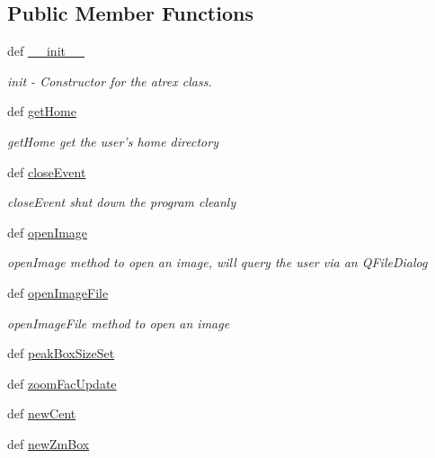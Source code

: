 \subsection*{Public Member Functions}
\begin{DoxyCompactItemize}
\item 
def \hyperlink{class_atrex_1_1_atrex_a3c7c6f6088f83b942d6773648e1e6347}{\-\_\-\-\_\-init\-\_\-\-\_\-}
\begin{DoxyCompactList}\small\item\em init -\/ Constructor for the atrex class. \end{DoxyCompactList}\item 
def \hyperlink{class_atrex_1_1_atrex_a6877cdfc8717ffc47d5e25a7fa1385f3}{get\-Home}
\begin{DoxyCompactList}\small\item\em get\-Home get the user's home directory \end{DoxyCompactList}\item 
def \hyperlink{class_atrex_1_1_atrex_a500ea9d7087f2aaf505f87998d1cf526}{close\-Event}
\begin{DoxyCompactList}\small\item\em close\-Event shut down the program cleanly \end{DoxyCompactList}\item 
def \hyperlink{class_atrex_1_1_atrex_aab80061d4d2127e82b592cbf5baef054}{open\-Image}
\begin{DoxyCompactList}\small\item\em open\-Image method to open an image, will query the user via an Q\-File\-Dialog \end{DoxyCompactList}\item 
def \hyperlink{class_atrex_1_1_atrex_a25ef435a888471b35045f63fad55b176}{open\-Image\-File}
\begin{DoxyCompactList}\small\item\em open\-Image\-File method to open an image \end{DoxyCompactList}\item 
def \hyperlink{class_atrex_1_1_atrex_ab96f78f24269b2608673faa9cec31ad8}{peak\-Box\-Size\-Set}
\item 
def \hyperlink{class_atrex_1_1_atrex_a02d26a480697d4631d2d8d2c76567a5b}{zoom\-Fac\-Update}
\item 
def \hyperlink{class_atrex_1_1_atrex_ab94534c12f07a7fcce69bbfc8a175692}{new\-Cent}
\item 
def \hyperlink{class_atrex_1_1_atrex_a3031c6519f2f84e9eee3a482f27132cc}{new\-Zm\-Box}

\end{DoxyCompactItemize}
